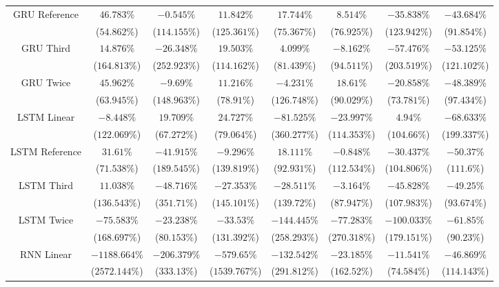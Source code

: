 \begin{table}[!ht]
{\begin{tabular}{|c|c|c|c|c|c|c|c|}
			\multirow{2}{*}{GRU Reference} & $46.783\%$ & $-0.545\%$ & $11.842\%$ & $17.744\%$ & $8.514\%$ & $-35.838\%$ & $-43.684\%$ \\
			 & ($54.862\%$) & ($114.155\%$) & ($125.361\%$) & ($75.367\%$) & ($76.925\%$) & ($123.942\%$) & ($91.854\%$) \\ \hline
			\multirow{2}{*}{GRU Third} & $14.876\%$ & $-26.348\%$ & $19.503\%$ & $4.099\%$ & $-8.162\%$ & $-57.476\%$ & $-53.125\%$ \\
			 & ($164.813\%$) & ($252.923\%$) & ($114.162\%$) & ($81.439\%$) & ($94.511\%$) & ($203.519\%$) & ($121.102\%$) \\ \hline
			\multirow{2}{*}{GRU Twice} & $45.962\%$ & $-9.69\%$ & $11.216\%$ & $-4.231\%$ & $18.61\%$ & $-20.858\%$ & $-48.389\%$ \\
			 & ($63.945\%$) & ($148.963\%$) & ($78.91\%$) & ($126.748\%$) & ($90.029\%$) & ($73.781\%$) & ($97.434\%$) \\ \hline
			\multirow{2}{*}{LSTM Linear} & $-8.448\%$ & $19.709\%$ & $24.727\%$ & $-81.525\%$ & $-23.997\%$ & $4.94\%$ & $-68.633\%$ \\
			 & ($122.069\%$) & ($67.272\%$) & ($79.064\%$) & ($360.277\%$) & ($114.353\%$) & ($104.66\%$) & ($199.337\%$) \\ \hline
			\multirow{2}{*}{LSTM Reference} & $31.61\%$ & $-41.915\%$ & $-9.296\%$ & $18.111\%$ & $-0.848\%$ & $-30.437\%$ & $-50.37\%$ \\
			 & ($71.538\%$) & ($189.545\%$) & ($139.819\%$) & ($92.931\%$) & ($112.534\%$) & ($104.806\%$) & ($111.6\%$) \\ \hline
			\multirow{2}{*}{LSTM Third} & $11.038\%$ & $-48.716\%$ & $-27.353\%$ & $-28.511\%$ & $-3.164\%$ & $-45.828\%$ & $-49.25\%$ \\
			 & ($136.543\%$) & ($351.71\%$) & ($145.101\%$) & ($139.72\%$) & ($87.947\%$) & ($107.983\%$) & ($93.674\%$) \\ \hline
			\multirow{2}{*}{LSTM Twice} & $-75.583\%$ & $-23.238\%$ & $-33.53\%$ & $-144.445\%$ & $-77.283\%$ & $-100.033\%$ & $-61.85\%$ \\
			 & ($168.697\%$) & ($80.153\%$) & ($131.392\%$) & ($258.293\%$) & ($270.318\%$) & ($179.151\%$) & ($90.23\%$) \\ \hline
			\multirow{2}{*}{RNN Linear} & $-1188.664\%$ & $-206.379\%$ & $-579.65\%$ & $-132.542\%$ & $-23.185\%$ & $-11.541\%$ & $-46.869\%$ \\
			 & ($2572.144\%$) & ($333.13\%$) & ($1539.767\%$) & ($291.812\%$) & ($162.52\%$) & ($74.584\%$) & ($114.143\%$) \\ \hline

\end{tabular}}
\end{table}
